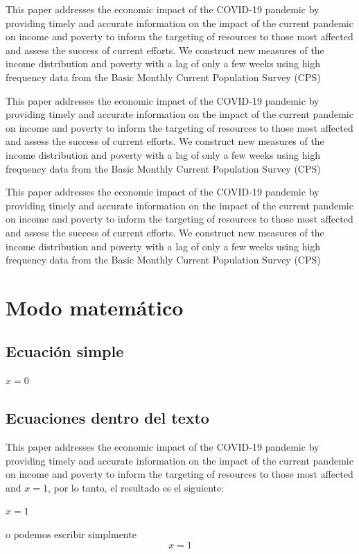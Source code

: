 \documentclass{article}
\begin{document}
            \begin{center}
                This paper addresses the economic impact of the COVID-19 pandemic by providing timely and accurate information on the impact of the current pandemic on income and poverty to inform the targeting of resources to those most affected and assess the success of current efforts. We construct new measures of the income distribution and poverty with a lag of only a few weeks using high frequency data from the Basic Monthly Current Population Survey (CPS) \citet{saldana2013arroz}
            \end{center}
            
            \begin{flushleft}
                This paper addresses the economic impact of the COVID-19 pandemic by providing timely and accurate information on the impact of the current pandemic on income and poverty to inform the targeting of resources to those most affected and assess the success of current efforts. We construct new measures of the income distribution and poverty with a lag of only a few weeks using high frequency data from the Basic Monthly Current Population Survey (CPS)
            \end{flushleft}
            
            \begin{flushright}
                This paper addresses the economic impact of the COVID-19 pandemic by providing timely and accurate information on the impact of the current pandemic on income and poverty to inform the targeting of resources to those most affected and assess the success of current efforts. We construct new measures of the income distribution and poverty with a lag of only a few weeks using high frequency data from the Basic Monthly Current Population Survey (CPS)
            \end{flushright}

\section{Modo matemático}
    \subsection{Ecuación simple}
        $x = 0$
    
    \subsection{Ecuaciones dentro del texto}
        This paper addresses the economic impact of the COVID-19 pandemic by providing timely and accurate information on the impact of the current pandemic on income and poverty to inform the targeting of resources to those most affected and $x=1$, por lo tanto, el resultado es el siguiente:
            \begin{center}
                $x=1$
            \end{center}
        o podemos escribir simplmente
            $$x=1$$
    
\end{document}
